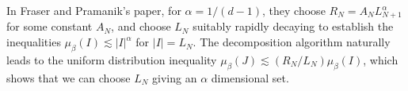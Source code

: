 \begin{example}
    In Fraser and Pramanik's paper, for $\alpha = 1/(d-1)$, they choose $R_N = A_N L_{N+1}^\alpha$ for some constant $A_N$, and choose $L_N$ suitably rapidly decaying to establish the inequalities $\mu_\beta(I) \lesssim |I|^\alpha$ for $|I| = L_N$. The decomposition algorithm naturally leads to the uniform distribution inequality $\mu_\beta(J) \lesssim (R_N/L_N) \mu_\beta(I)$, which shows that we can choose $L_N$ giving an $\alpha$ dimensional set.
\end{example}


\endinput